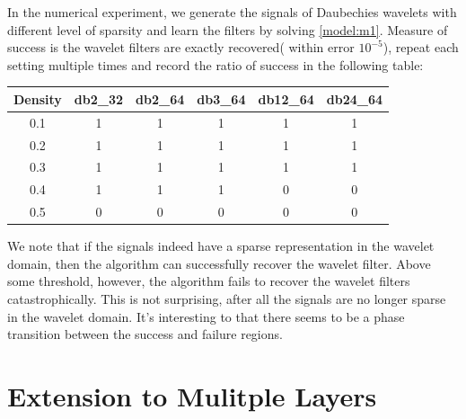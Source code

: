 \documentclass[a4paper]{article}
\begin{document}
In the numerical experiment, we generate the signals of Daubechies wavelets with different level of sparsity and learn the filters by solving \eqref{model:m1}. Measure of success is the wavelet filters are exactly recovered( within error $10^{-5}$), repeat each setting multiple times and record the ratio of success in the following table:
\begin{center}
\begin{tabular}{| c | c | c | c| c | c |}
	\hline
	Density & db2\_32 & db2\_64 & db3\_64 & db12\_64 & db24\_64 \\
	\hline
	0.1 & 1 & 1 & 1 & 1 & 1 \\
	\hline
	0.2 & 1 & 1& 1 & 1 & 1 \\
	\hline 
	0.3 & 1 & 1 & 1 & 1 & 1  \\
	\hline
	0.4 & 1 & 1 & 1 & 0 & 0  \\
	\hline 
	0.5 & 0 & 0 & 0 & 0 & 0 \\
	\hline
\end{tabular}
\end{center}
We note that if the signals indeed have a sparse representation in the wavelet domain, then the algorithm can successfully recover the wavelet filter. Above some threshold, however, the algorithm fails to recover the wavelet filters catastrophically. This is not surprising, after all the signals are no longer sparse in the wavelet domain. It's interesting to that there seems to be a phase transition between the success and failure regions.


\section{Extension to Mulitple Layers}
\end{document}
